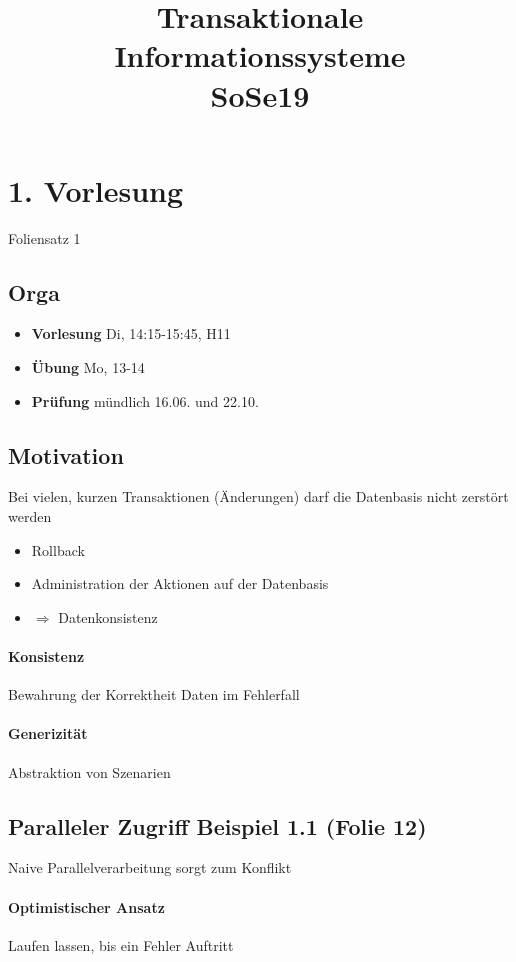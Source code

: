 \documentclass[ngerman]{scrartcl}
\title{Transaktionale Informationssysteme \\ SoSe19}
\begin{document}
\maketitle
\tableofcontents
\newpage
\begin{abstract}
\end{abstract}

\section{1. Vorlesung}
Foliensatz 1
\subsection*{Orga}
\begin{itemize}
  \item \textbf{Vorlesung} Di, 14:15-15:45, H11
  \item \textbf{Übung} Mo, 13-14
  \item \textbf{Prüfung} mündlich 16.06. und 22.10.
\end{itemize}
\subsection*{Motivation}
Bei vielen, kurzen Transaktionen (Änderungen) darf die Datenbasis nicht zerstört werden
\begin{itemize}
  \item Rollback
  \item Administration der Aktionen auf der Datenbasis
  \item $\Rightarrow$ Datenkonsistenz
\end{itemize}
\paragraph*{Konsistenz}
Bewahrung der Korrektheit Daten im Fehlerfall

\paragraph*{Generizität}
Abstraktion von Szenarien

\subsection*{Paralleler Zugriff Beispiel 1.1 (Folie 12)}
Naive Parallelverarbeitung sorgt zum Konflikt

\paragraph*{Optimistischer Ansatz}
Laufen lassen, bis ein Fehler Auftritt
\end{document}
